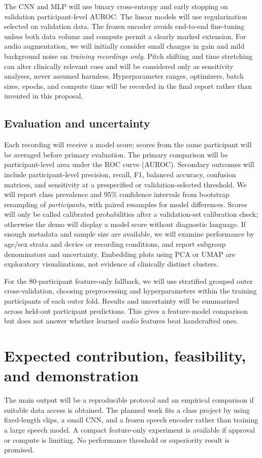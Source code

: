 \documentclass{article}
\begin{document}
The CNN and MLP will use binary cross-entropy and early stopping on validation participant-level AUROC. The linear models will use regularization selected on validation data. The frozen encoder avoids end-to-end fine-tuning unless both data volume and compute permit a clearly marked extension. For audio augmentation, we will initially consider small changes in gain and mild background noise on \emph{training recordings only}. Pitch shifting and time stretching can alter clinically relevant cues and will be considered only as sensitivity analyses, never assumed harmless. Hyperparameter ranges, optimizers, batch sizes, epochs, and compute time will be recorded in the final report rather than invented in this proposal.

\subsection{Evaluation and uncertainty}
Each recording will receive a model score; scores from the same participant will be averaged before primary evaluation. The primary comparison will be participant-level area under the ROC curve (AUROC). Secondary outcomes will include participant-level precision, recall, F1, balanced accuracy, confusion matrices, and sensitivity at a prespecified or validation-selected threshold. We will report class prevalence and 95\% confidence intervals from bootstrap resampling of \emph{participants}, with paired resamples for model differences. Scores will only be called calibrated probabilities after a validation-set calibration check; otherwise the demo will display a model score without diagnostic language. If enough metadata and sample size are available, we will examine performance by age/sex strata and device or recording conditions, and report subgroup denominators and uncertainty. Embedding plots using PCA or UMAP are exploratory visualizations, not evidence of clinically distinct clusters.

For the 80-participant feature-only fallback, we will use stratified grouped outer cross-validation, choosing preprocessing and hyperparameters within the training participants of each outer fold. Results and uncertainty will be summarized across held-out participant predictions. This gives a feature-model comparison but does not answer whether learned \emph{audio} features beat handcrafted ones.

\section{Expected contribution, feasibility, and demonstration}
The main output will be a reproducible protocol and an empirical comparison if suitable data access is obtained. The planned work fits a class project by using fixed-length clips, a small CNN, and a frozen speech encoder rather than training a large speech model. A compact feature-only experiment is available if approval or compute is limiting. No performance threshold or superiority result is promised.
\end{document}
